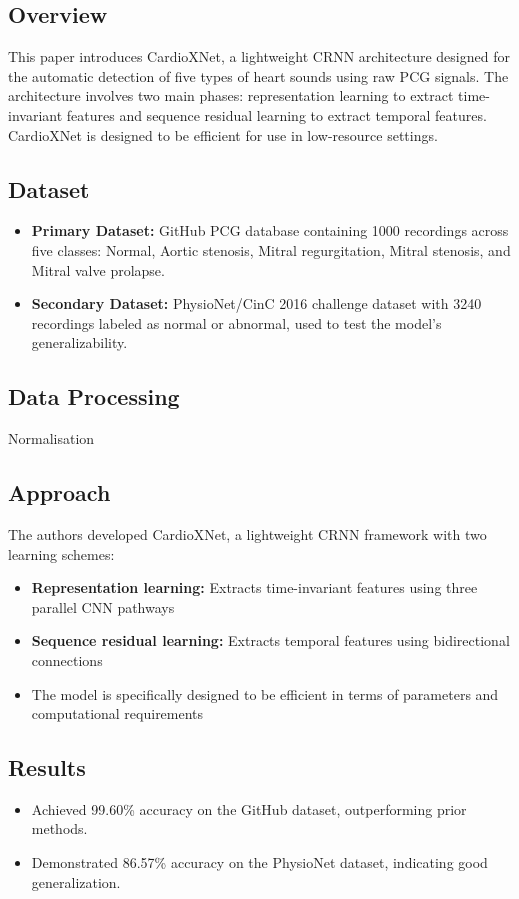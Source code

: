 \subsection*{Overview}
This paper introduces CardioXNet, a lightweight CRNN architecture designed for the automatic detection of five types of heart sounds using raw PCG signals. The architecture involves two main phases: representation learning to extract time-invariant features and sequence residual learning to extract temporal features. CardioXNet is designed to be efficient for use in low-resource settings.

\subsection*{Dataset}
\begin{itemize}
    \item \textbf{Primary Dataset:} GitHub PCG database containing 1000 recordings across five classes: Normal, Aortic stenosis, Mitral regurgitation, Mitral stenosis, and Mitral valve prolapse.
    \item \textbf{Secondary Dataset:} PhysioNet/CinC 2016 challenge dataset with 3240 recordings labeled as normal or abnormal, used to test the model's generalizability.
\end{itemize}

\subsection*{Data Processing}
Normalisation

\subsection*{Approach}
The authors developed CardioXNet, a lightweight CRNN framework with two learning schemes:
\begin{itemize}
    \item \textbf{Representation learning:} Extracts time-invariant features using three parallel CNN pathways
    \item \textbf{Sequence residual learning:} Extracts temporal features using bidirectional connections
    \item The model is specifically designed to be efficient in terms of parameters and computational requirements
\end{itemize}

\subsection*{Results}
\begin{itemize}
    \item Achieved 99.60\% accuracy on the GitHub dataset, outperforming prior methods.
    \item Demonstrated 86.57\% accuracy on the PhysioNet dataset, indicating good generalization.
\end{itemize}

